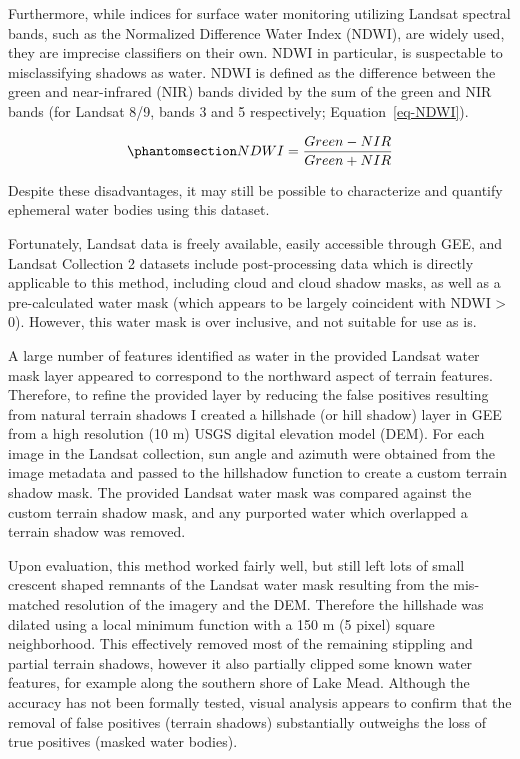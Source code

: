 \documentclass[
]{agujournal2019}
\begin{document}
Furthermore, while indices for surface water monitoring utilizing
Landsat spectral bands, such as the Normalized Difference Water Index
(NDWI), are widely used, they are imprecise classifiers on their own.
NDWI in particular, is suspectable to misclassifying shadows as water.
NDWI is defined as the difference between the green and near-infrared
(NIR) bands divided by the sum of the green and NIR bands (for Landsat
8/9, bands 3 and 5 respectively; Equation~\ref{eq-NDWI}).

\begin{equation}\phantomsection\label{eq-NDWI}{
NDWI = \frac{Green - NIR}{Green + NIR}
}\end{equation}

Despite these disadvantages, it may still be possible to characterize
and quantify ephemeral water bodies using this dataset.

Fortunately, Landsat data is freely available, easily accessible through
GEE, and Landsat Collection 2 datasets include post-processing data
which is directly applicable to this method, including cloud and cloud
shadow masks, as well as a pre-calculated water mask (which appears to
be largely coincident with NDWI \textgreater{} 0). However, this water
mask is over inclusive, and not suitable for use as is.

A large number of features identified as water in the provided Landsat
water mask layer appeared to correspond to the northward aspect of
terrain features. Therefore, to refine the provided layer by reducing
the false positives resulting from natural terrain shadows I created a
hillshade (or hill shadow) layer in GEE from a high resolution (10 m)
USGS digital elevation model (DEM). For each image in the Landsat
collection, sun angle and azimuth were obtained from the image metadata
and passed to the hillshadow function to create a custom terrain shadow
mask. The provided Landsat water mask was compared against the custom
terrain shadow mask, and any purported water which overlapped a terrain
shadow was removed.

Upon evaluation, this method worked fairly well, but still left lots of
small crescent shaped remnants of the Landsat water mask resulting from
the mis-matched resolution of the imagery and the DEM. Therefore the
hillshade was dilated using a local minimum function with a 150 m (5
pixel) square neighborhood. This effectively removed most of the
remaining stippling and partial terrain shadows, however it also
partially clipped some known water features, for example along the
southern shore of Lake Mead. Although the accuracy has not been formally
tested, visual analysis appears to confirm that the removal of false
positives (terrain shadows) substantially outweighs the loss of true
positives (masked water bodies).
\end{document}
